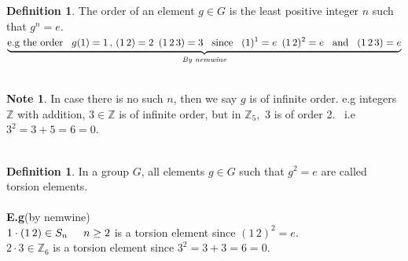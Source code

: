 \documentclass[11pt,a4paper]{article}
\theoremstyle{definition}
\newtheorem{defn}[thm]{Definition}
\newtheorem*{note}{Note}
\begin{document}
\begin{defn}
The order of an element $g\in G$ is the least positive integer $n$ such that $g^n = e$.\\

$\underbrace{\text{e.g the order}\hspace{0.3cm} g(1) = 1\, , \, (1\,2) = 2\,\, \, (1\, 2\, 3) = 3\hspace{0.3cm} \text{since}\hspace{0.3cm}(1)^1 = e\,\, \, (1\,2)^2 = e\hspace{0.3cm}\text{and}\hspace{0.3cm}(1\, 2\, 3) = e}_{\textit{By nemwine}}$\\\\
\end{defn}






\begin{note}
In case there is no such $n$, then we say $g$ is of infinite order. e.g integers $\mathbb{Z}$ with addition, $3\in \mathbb{Z}$ is of infinite order, but in $\mathbb{Z}_5, \, \, 3$ is of order 2. $\,$ i.e $3^2 = 3 + 5 = 6 = 0$.\\\\
\end{note}






\begin{defn}
In a group $G$, all elements $g\in G$ such that $g^2 = e$ are called torsion elements.\\\\


\textbf{E.g}(by nemwine)\\
$1\cdot (1\,2)\in S_n\hspace{0.5cm} n\geq 2$ is a torsion element since $(1\, 2)^2 = e$.\\

$2\cdot 3 \in \mathbb{Z}_6$ is a torsion element since $3^2 = 3 + 3 = 6 = 0$.\\\\\
\end{defn}
\end{document}
